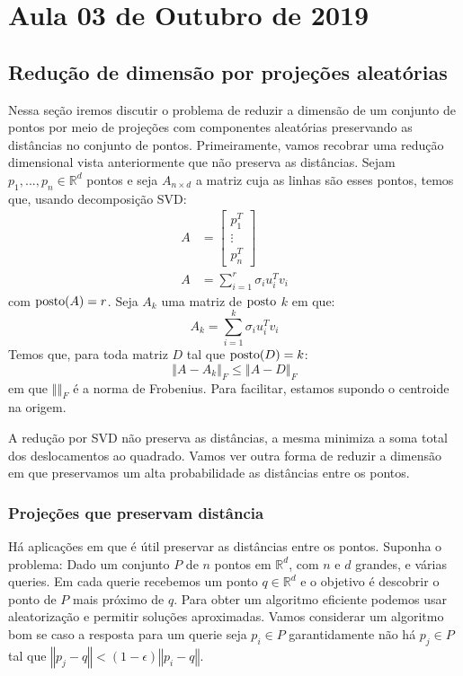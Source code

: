 \section{Aula 03 de Outubro de 2019}
\label{2019_10_03}

\subsection{Redução de dimensão por projeções aleatórias}
Nessa seção iremos discutir o problema de reduzir a dimensão de um conjunto de pontos por meio de projeções com componentes aleatórias preservando as distâncias no conjunto de pontos. Primeiramente, vamos recobrar uma redução dimensional vista anteriormente que não preserva as distâncias.
Sejam $p_1,...,p_n \in \mathbb{R}^d$ pontos e seja $A_{n \times d}$ a matriz cuja as linhas são esses pontos, temos que, usando decomposição SVD:
\begin{align*}
A &=
  \begin{bmatrix}
    p_1^T \\
    \vdots \\
    p_n^T
  \end{bmatrix}\\
   A &= \sum\limits_{i = 1}^r \sigma_i u_i^T v_i    
\end{align*}
com $\operatorname{posto}(A) = r$. Seja $A_k$ uma matriz de $\operatorname{posto}$ $k$ em que: 
\begin{equation*}
    A_k = \sum\limits_{i = 1}^k \sigma_i u_i^T v_i    
\end{equation*}
Temos que, para toda matriz $D$ tal que $\operatorname{posto}(D)=k$:
\begin{equation*}
    \left\Vert A - A_k \right\Vert_F \leq \left\Vert A - D \right\Vert_F
\end{equation*}
em que $\left\Vert \right\Vert_F$ é a norma de Frobenius. Para facilitar, estamos supondo o centroide na origem.


A redução por SVD não preserva as distâncias, a mesma minimiza a soma total dos deslocamentos ao quadrado. Vamos ver outra forma de reduzir a dimensão em que preservamos um alta probabilidade as distâncias entre os pontos.
\subsubsection{Projeções que preservam distância} Há aplicações em que é útil preservar as distâncias entre os pontos. Suponha o problema: Dado um conjunto $P$ de $n$ pontos em $\mathbb{R}^d$, com $n$ e $d$ grandes, e várias queries. Em cada querie recebemos um ponto $q \in \mathbb{R}^d$ e o objetivo é descobrir o ponto de $P$ mais próximo de $q$. Para obter um algoritmo eficiente podemos usar aleatorização e permitir soluções aproximadas. Vamos considerar um algoritmo bom se caso a resposta para um querie seja $p_i \in P$ garantidamente não há $p_j \in P$ tal que $\left\Vert p_j - q \right\Vert <(1 - \epsilon) \left\Vert p_i - q \right\Vert$. 


